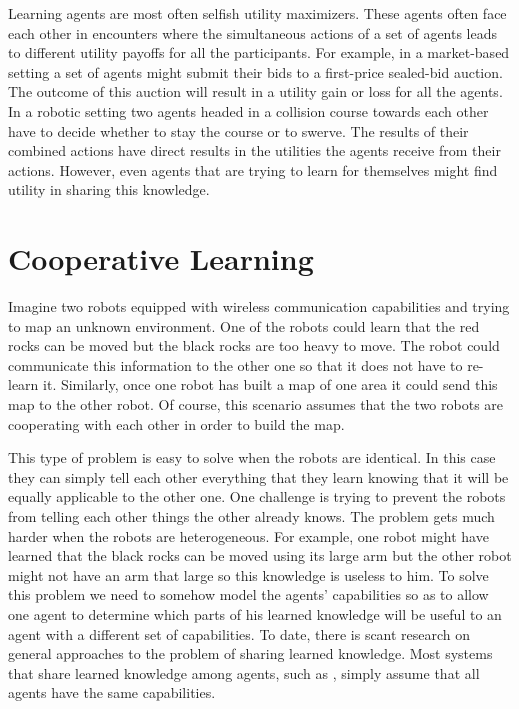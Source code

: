 Learning agents are most often selfish utility maximizers. These
agents often face each other in encounters where the simultaneous
actions of a set of agents leads to different utility payoffs for all
the participants. For example, in a market-based setting a set of
agents might submit their bids to a first-price sealed-bid auction.
The outcome of this auction will result in a utility gain or loss for
all the agents. In a robotic setting two agents headed in a collision
course towards each other have to decide whether to stay the course or
to swerve. The results of their combined actions have direct results
in the utilities the agents receive from their actions. However, even
agents that are trying to learn for themselves might find utility in
sharing this knowledge.



\section{Cooperative Learning}
\label{sec:cooperative-learning}

Imagine two robots equipped with wireless communication capabilities
and trying to map an unknown environment. One of the robots could
learn that the red rocks can be moved but the black rocks are too
heavy to move. The robot could communicate this information to the
other one so that it does not have to re-learn it. Similarly, once one
robot has built a map of one area it could send this map to the other
robot. Of course, this scenario assumes that the two robots are
cooperating with each other in order to build the map.

This type of problem is easy to solve when the robots are identical.
In this case they can simply tell each other everything that they
learn knowing that it will be equally applicable to the other one. One
challenge is trying to prevent the robots from telling each other
things the other already knows. The problem gets much harder when the
robots are heterogeneous. For example, one robot might have learned
that the black rocks can be moved using its large arm but the other
robot might not have an arm that large so this knowledge is useless to
him. To solve this problem we need to somehow model the agents'
capabilities so as to allow one agent to determine which parts of his
learned knowledge will be useful to an agent with a different set of
capabilities. To date, there is scant research on general approaches
to the problem of sharing learned knowledge. Most systems that share
learned knowledge among agents, such as \cite{stone00a}, simply assume
that all agents have the same capabilities.


